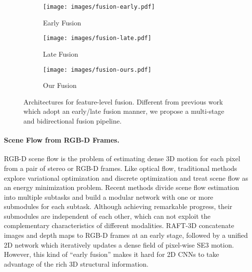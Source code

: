 \documentclass[10pt,twocolumn,letterpaper]{article}
\begin{document}
\begin{figure}[t]
    \centering
    \begin{subfigure}[b]{0.49\linewidth}
        \texttt{[image: images/fusion-early.pdf]}\caption{Early Fusion}
        \label{fig:fusion-early}
    \end{subfigure}\hfill
    \begin{subfigure}[b]{0.49\linewidth}
        \texttt{[image: images/fusion-late.pdf]}\caption{Late Fusion}
        \label{fig:fusion-late}
    \end{subfigure}\hfill
    \begin{subfigure}[b]{0.98\linewidth}
        \texttt{[image: images/fusion-ours.pdf]}\caption{Our Fusion}
        \label{fig:fusion-ours}
    \end{subfigure}

    \vspace{-5pt}
    \caption{Architectures for feature-level fusion. Different from previous work which adopt an early/late fusion manner, we propose a multi-stage and bidirectional fusion pipeline.}
    \vspace{-12pt}
\end{figure}

\vspace{-10pt}
\paragraph{Scene Flow from RGB-D Frames.} RGB-D scene flow is the problem of estimating dense 3D motion for each pixel from a pair of stereo or RGB-D frames. Like optical flow, traditional methods \cite{menze2015osf, quiroga2014dense, jaimez2015primal, jaimez2015motion} explore variational optimization and discrete optimization and treat scene flow as an energy minimization problem. Recent methods \cite{behl2017isf, ma2019drisf, yang2020opticalexp, yang2021rigidmask} divide scene flow estimation into multiple subtasks and build a modular network with one or more submodules for each subtask. Although achieving remarkable progress, their submodules are independent of each other, which can not exploit the complementary characteristics of different modalities. RAFT-3D \cite{teed2021raft3d} concatenate images and depth maps to RGB-D frames at an early stage, followed by a unified 2D network which iteratively updates a dense field of pixel-wise SE3 motion. However, this kind of ``early fusion'' makes it hard for 2D CNNs to take advantage of the rich 3D structural information.
\end{document}

